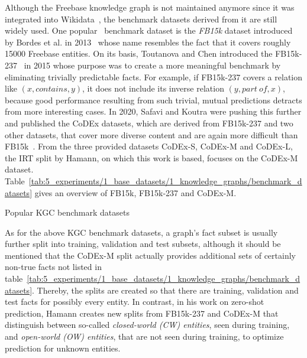 Although the Freebase knowledge graph is not maintained anymore since it was integrated into Wikidata~\cite{Tanon2016FromFT}, the benchmark datasets derived from it are still widely used. One popular~\cite{Toutanova2015RepresentingTF} benchmark dataset is the \emph{FB15k} dataset introduced by Bordes et al. in 2013~\cite{Bordes2013TranslatingEF} whose name resembles the fact that it covers roughly \num{15000} Freebase entities. On its basis, Toutanova and Chen introduced the FB15k-237~\cite{Toutanova2015ObservedVL} in 2015 whose purpose was to create a more meaningful benchmark by eliminating trivially predictable facts. For example, if FB15k-237 covers a relation like $(x, contains, y)$, it does not include its inverse relation $(y, part~of, x)$, because good performance resulting from such trivial, mutual predictions detracts from more interesting cases. In 2020, Safavi and Koutra were pushing this further and published the CoDEx datasets, which are derived from FB15k-237 and two other datasets, that cover more diverse content and are again more difficult than FB15k~\cite{Safavi2020CoDExAC}. From the three provided datasets CoDEx-S, CoDEx-M and CoDEx-L, the IRT split by Hamann, on which this work is based, focuses on the CoDEx-M dataset. Table~\ref{tab:5_experiments/1_base_datasets/1_knowledge_graphs/benchmark_datasets} gives an overview of FB15k, FB15k-237 and CoDEx-M.

\begin{table}[h]
    \centering
    
    \caption{Popular KGC benchmark datasets}
    \label{tab:5_experiments/1_base_datasets/1_knowledge_graphs/benchmark_datasets}
\end{table}

As for the above KGC benchmark datasets, a graph's fact subset is usually further split into training, validation and test subsets, although it should be mentioned that the CoDEx-M split actually provides additional sets of certainly non-true facts not listed in table~\ref{tab:5_experiments/1_base_datasets/1_knowledge_graphs/benchmark_datasets}. Thereby, the splits are created so that there are training, validation and test facts for possibly every entity. In contrast, in his work on zero-shot prediction, Hamann creates new splits from FB15k-237 and CoDEx-M that distinguish between so-called \emph{closed-world (CW) entities}, seen during training, and \emph{open-world (OW) entities}, that are not seen during training, to optimize prediction for unknown entities.

